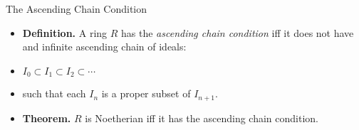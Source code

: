 \documentclass{beamer}
\begin{document}

\begin{frame}{The Ascending Chain Condition}

\begin{itemize}
  \item \textbf{Definition.} A ring $R$ has the \emph{ascending chain condition} iff it does not have and infinite
  ascending chain of ideals:
  \item $I_0 \subset  I_1 \subset I_2 \subset \cdots$
  \item such that each $I_n$ is a proper subset of $I_{n+1}$.
  \item \textbf{Theorem.} $R$ is Noetherian iff it has the ascending chain condition.
\end{itemize}

\end{frame}


\end{document}
